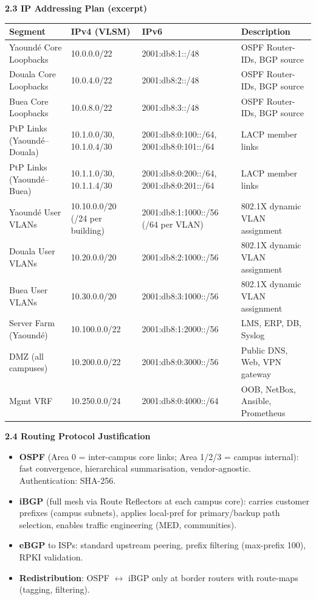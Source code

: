 \documentclass[11pt]{article}
\begin{document}
\begin{exoresolu}
\textbf{2.3 IP Addressing Plan (excerpt)}
\begin{center}
\begin{tabularx}{\linewidth}{|l|l|l|X|}
\hline
\rowcolor{popblueL}
\textbf{Segment} & \textbf{IPv4 (VLSM)} & \textbf{IPv6} & \textbf{Description} \\
\hline
Yaoundé Core Loopbacks & 10.0.0.0/22 & 2001:db8:1::/48 & OSPF Router-IDs, BGP source \\
\hline
Douala Core Loopbacks & 10.0.4.0/22 & 2001:db8:2::/48 & OSPF Router-IDs, BGP source \\
\hline
Buea Core Loopbacks & 10.0.8.0/22 & 2001:db8:3::/48 & OSPF Router-IDs, BGP source \\
\hline
PtP Links (Yaoundé–Douala) & 10.1.0.0/30, 10.1.0.4/30 & 2001:db8:0:100::/64, 2001:db8:0:101::/64 & LACP member links \\
\hline
PtP Links (Yaoundé–Buea) & 10.1.1.0/30, 10.1.1.4/30 & 2001:db8:0:200::/64, 2001:db8:0:201::/64 & LACP member links \\
\hline
Yaoundé User VLANs & 10.10.0.0/20 (/24 per building) & 2001:db8:1:1000::/56 (/64 per VLAN) & 802.1X dynamic VLAN assignment \\
\hline
Douala User VLANs & 10.20.0.0/20 & 2001:db8:2:1000::/56 & 802.1X dynamic VLAN assignment \\
\hline
Buea User VLANs & 10.30.0.0/20 & 2001:db8:3:1000::/56 & 802.1X dynamic VLAN assignment \\
\hline
Server Farm (Yaoundé) & 10.100.0.0/22 & 2001:db8:1:2000::/56 & LMS, ERP, DB, Syslog \\
\hline
DMZ (all campuses) & 10.200.0.0/22 & 2001:db8:0:3000::/56 & Public DNS, Web, VPN gateway \\
\hline
Mgmt VRF & 10.250.0.0/24 & 2001:db8:0:4000::/64 & OOB, NetBox, Ansible, Prometheus \\
\hline
\end{tabularx}
\end{center}

\textbf{2.4 Routing Protocol Justification}
\begin{itemize}
    \item \textbf{OSPF} (Area 0 = inter-campus core links; Area 1/2/3 = campus internal): fast convergence, hierarchical summarisation, vendor-agnostic. Authentication: SHA-256.
    \item \textbf{iBGP} (full mesh via Route Reflectors at each campus core): carries customer prefixes (campus subnets), applies local-pref for primary/backup path selection, enables traffic engineering (MED, communities).
    \item \textbf{eBGP} to ISPs: standard upstream peering, prefix filtering (max-prefix 100), RPKI validation.
    \item \textbf{Redistribution}: OSPF $\leftrightarrow$ iBGP only at border routers with route-maps (tagging, filtering).
\end{itemize}


\end{exoresolu}
\end{document}
